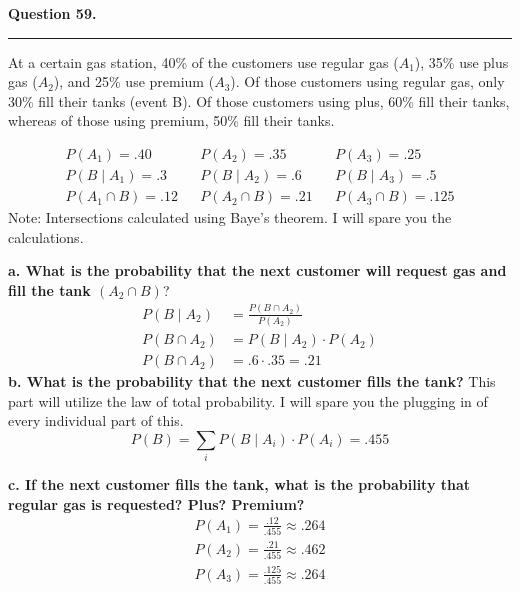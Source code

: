 \textbf{Question 59.} \\
\hrule 

At a certain gas station, 40\% of the customers use regular gas ($A_1$), 35\% use plus gas ($A_2$), and 25\% use premium ($A_3$). Of those customers using regular gas, only 30\% fill their tanks (event B). Of those customers using plus, 60\% fill their tanks, whereas of those using premium, 50\% fill their tanks.

\begin{align*}
    P(A_1) = .40 && P(A_2) = .35 && P(A_3) = .25 \\
    P(B \; | \; A_1) = .3 && P(B \; | \; A_2) = .6 && P(B \; | \; A_3) = .5 \\
    P(A_1 \cap B) = .12 && P(A_2 \cap B) = .21 && P(A_3 \cap B) = .125
\end{align*}
Note: Intersections calculated using Baye's theorem. I will spare you the calculations. 

\textbf{a. What is the probability that the next customer will request gas and fill the tank $(A_2 \cap B)$}?
\begin{align*}
    P(B \; | \; A_2) &= \frac{P(B \cap A_2)}{P(A_2)} \\[3mm]
    P(B \cap A_2) &= P(B \; | \; A_2) \cdot P(A_2) \\[3mm]
    P(B \cap A_2) &= .6 \cdot .35 = \boxed{.21}
\end{align*}
\textbf{b. What is the probability that the next customer fills the tank?} \newline 
This part will utilize the law of total probability. I will spare you the plugging in of every individual part of this. 
\[P(B) = \sum_i P(B \; | \; A_i)\cdot P(A_i) = \boxed{.455}\]

\textbf{c. If the next customer fills the tank, what is the probability that regular gas is requested? Plus? Premium?} 
\begin{align*}
    P(A_1) = \frac{.12}{.455} \approx \boxed{.264} \\[3mm]
    P(A_2) = \frac{.21}{.455} \approx \boxed{.462} \\[3mm]
    P(A_3) = \frac{.125}{.455} \approx \boxed{.264}
\end{align*}